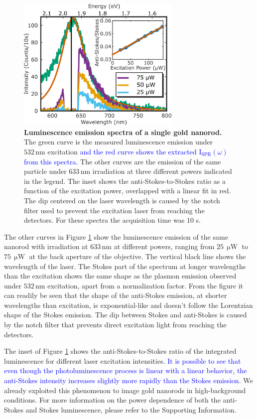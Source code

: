 \documentclass[journal=nalefd,manuscript=letter]{achemso}
\newcommand{\HI}[1]{\textcolor{blue}{#1}} %
\newcommand{\nm}{\ensuremath{\,\textrm{nm}}}
\newcommand{\uW}{\ensuremath{\,\upmu\textrm{W}}}
\begin{document}
\begin{figure}[tp] \centering
\includegraphics[width=78.4mm]{Figures/02_Several_Intensities/02_several_intensities.png}
\caption{\textbf{Luminescence emission spectra of a single gold nanorod.} The green curve is the
measured luminescence emission under $532\nm$ excitation \HI{and the red curve shows the 
extracted $\textrm{I}_{\textrm{SPR}}(\omega)$ from this spectra.}
The other curves are the emission of the same particle under $633\nm$ irradiation at three 
different powers indicated in the legend. The inset shows the anti-Stokes-to-Stokes ratio as a function
of the excitation power, overlapped with a linear fit in red. The dip centered on the laser wavelength
is caused by the notch filter used to prevent the excitation laser from reaching the detectors. For 
these spectra the acquisition time was $10$ s. }
	\label{fig:spectra_intensity}
\end{figure}

The other curves in Figure \ref{fig:spectra_intensity} show the luminescence emission of
the same nanorod with irradiation at $633\nm$ at different powers,
ranging from $25\uW$ to $75\uW$ at the back aperture of the objective.  
The vertical black line shows the wavelength of the laser. The Stokes part of the
spectrum at longer wavelengths than the excitation shows the same shape as the
plasmon emission observed under $532\nm$ excitation, apart from a normalization
factor. From the figure it can readily be seen that the shape of the anti-Stokes
emission, at shorter wavelengths than excitation, is exponential-like and
doesn't follow the Lorentzian shape of the Stokes emission. The dip between
Stokes and anti-Stokes is caused by the notch filter that prevents direct
excitation light from reaching the detectors. 

The inset of Figure \ref{fig:spectra_intensity} shows the anti-Stokes-to-Stokes ratio of
the integrated luminescence for different laser excitation intensities. \HI{It is
possible to see that even though the photoluminescence process is linear with a 
linear behavior, the anti-Stokes intensity increases slightly more rapidly than the Stokes emission.}
We already exploited this phenomenon to image gold nanorods in high-background
conditions\cite{Carattino2016a}. 
For more information on the power dependence of both the anti-Stokes and Stokes luminescence, 
please refer to the Supporting Information. 
\end{document}
